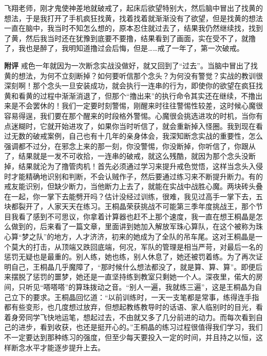 \begin{case}
    飞翔老师，刚才鬼使神差地就破戒了，起床后欲望特别大，然后脑中冒出了找黄的想法，于是我打开了手机疯狂找黄，找着找着就渐渐没有了欲望，但是找黄的想法一直在脑中，我当时不知怎么想的，原本忍住就过去了，结果我仍然继续找，找到了黄，然后我当时还在犹豫到底要不要撸，结果看到了画面，实在受不了，就撸了，我也是醉了，我明知道撸过会后悔，但是……戒了一年了，第一次破戒。

    \textbf{附评} 戒色一年就因为一次断念实战没做好，就又回到了“过去”。当脑中冒出了找黄的想法，为何不立刻断掉？如何要听信那个念头？为何没有警觉？实战的教训很深刻啊！那个念头一旦安装成功，就会执行一连串的行为，即使你的欲望在疯狂找黄和看黄的过程中渐渐消退了，但那个“撸出来”的执行命令其实还在继续，不撸出来是不会罢休的！我们一定要时刻警惕，刚醒来时往往警惕性较差，这时候心魔很容易得逞，我们要在那个醒来的时段格外警惕。心魔很会挑选进攻的时机，当你有点迷糊时，它就开始进攻了，如果你当时听信了，就会重新掉入怪圈。我到现在看过无数的破戒案例，自己也有十几年的亲身体会，我深知断念实战的重要性，怎么强调都不过分，在邪念上来的那一刻，你没警惕，你没断掉，你听信了，你跟从了，结果就是一发不可收拾，一连串的破戒，就这么残酷，就因为那个念头没断掉，结果就沦为了撸管肉机！首先必须通过学习来提升戒色觉悟，这样当念头入侵时才能精确地识别和判断，不会认贼作子，然后要通过练习来不断提升断力。有的戒友能识别，但缺少断力，当他断力上去了，就能在实战中战胜心魔。两块砖头叠在一起，你一掌下去能劈开吗？估计没经过训练，很难，我见过高手一掌下去，五块都裂开了，人家天天在练习。王桐晶荣获挑战不可能第三季年度挑战王，那个节目我看了感到不可思议，你拿着计算器也赶不上那个速度，我一直在想王桐晶是怎么做到的，后来看了一篇文章，里面讲到她加入解放军珠心算队，在这个被称为珠心算“梦之队”的地方，人才济济，初来的她成为了全队的吊车尾。这对王桐晶是一个莫大的打击，从顶端又跌回底端，何况，军队的管理是相当严苛，对最后一名的惩罚无疑也是最重的。别人练，她也练，别人休息了，她还被罚着练。为了再次证明自己，王桐晶几乎魔障了，“那时候什么想法都没了，就是算、算、算”。即便后来摆脱了惩罚的噩梦，她还是一直坚持练到教室只剩她一个人。深夜里，偌大的房间，只听见“嗒嗒嗒”的算珠拨动之音。“别人一遍，我就练三遍”，这是王桐晶为自己立下的要求。王桐晶回忆道：“以前训练时，一天一支笔都是常事，练得连手指都有些变形，也几度想过放弃，但想起教练教导时的话语、家人临别时的目光，看着身旁同学飞快地运笔，想起过去，不由就又多了几分前进的动力。而每次看到自己的进步，看到收获，也还是挺开心的。”王桐晶的练习过程很值得我们学习，我们不一定要达到那种练习的强度，但至少每天要投入一定的时间，并且持之以恒，这样断念水平才能逐步提升上去。
\end{case}

